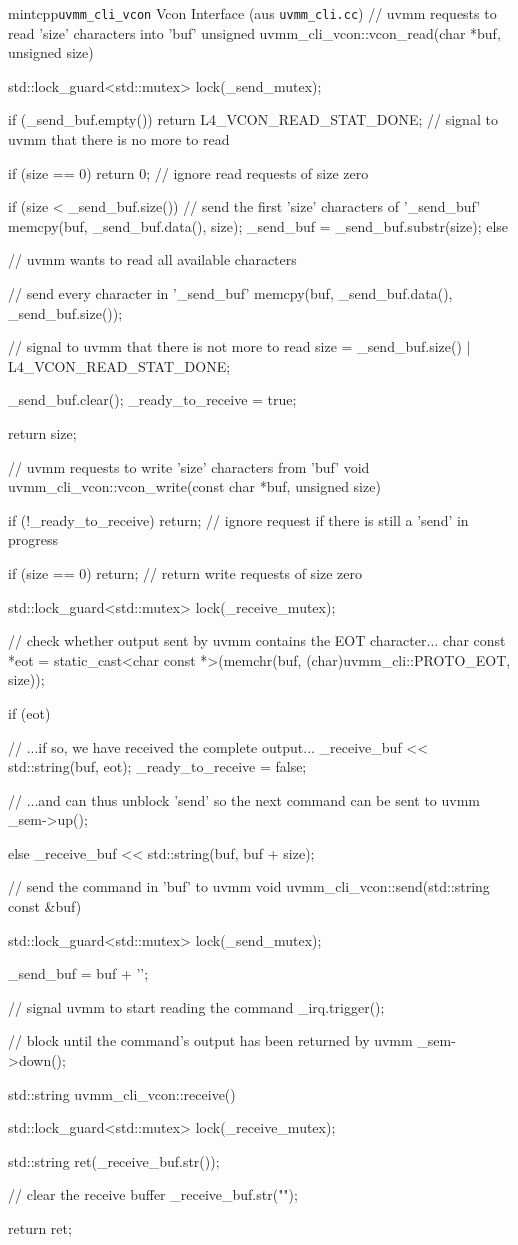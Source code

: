 \begin{mintlisting}[label=lst:uvmm_cli]{mintcpp}{\texttt{uvmm\_cli\_vcon} Vcon Interface (aus \texttt{uvmm\_cli.cc})}
// uvmm requests to read 'size' characters into 'buf'
unsigned uvmm_cli_vcon::vcon_read(char *buf, unsigned size)
{
  std::lock_guard<std::mutex> lock(_send_mutex);

  if (_send_buf.empty())
    return L4_VCON_READ_STAT_DONE; // signal to uvmm that there is no more to read

  if (size == 0)
    return 0; // ignore read requests of size zero

  if (size < _send_buf.size())
    {
      // send the first 'size' characters of '_send_buf'
      memcpy(buf, _send_buf.data(), size);
      _send_buf = _send_buf.substr(size);
    }
  else
    {
      // uvmm wants to read all available characters

      // send every character in '_send_buf'
      memcpy(buf, _send_buf.data(), _send_buf.size());

      // signal to uvmm that there is not more to read
      size = _send_buf.size() | L4_VCON_READ_STAT_DONE;

      _send_buf.clear();
      _ready_to_receive = true;
    }

  return size;
}

// uvmm requests to write 'size' characters from 'buf'
void uvmm_cli_vcon::vcon_write(const char *buf, unsigned size)
{
  if (!_ready_to_receive)
    return; // ignore request if there is still a 'send' in progress

  if (size == 0)
    return; // return write requests of size zero

  std::lock_guard<std::mutex> lock(_receive_mutex);

  // check whether output sent by uvmm contains the EOT character...
  char const *eot = static_cast<char const *>(memchr(buf, (char)uvmm_cli::PROTO_EOT, size));

  if (eot)
    {
      // ...if so, we have received the complete output...
      _receive_buf << std::string(buf, eot);
      _ready_to_receive = false;

      // ...and can thus unblock 'send' so the next command can be sent to uvmm
      _sem->up();
    }
  else
    {
      _receive_buf << std::string(buf, buf + size);
    }
}

// send the command in 'buf' to uvmm
void uvmm_cli_vcon::send(std::string const &buf)
{
  {
    std::lock_guard<std::mutex> lock(_send_mutex);

    _send_buf = buf + '\n';
  }

  // signal uvmm to start reading the command
  _irq.trigger();

  // block until the command's output has been returned by uvmm
  _sem->down();
}

std::string uvmm_cli_vcon::receive()
{
  std::lock_guard<std::mutex> lock(_receive_mutex);

  std::string ret(_receive_buf.str());

  // clear the receive buffer
  _receive_buf.str("");

  return ret;
}
\end{mintlisting}

